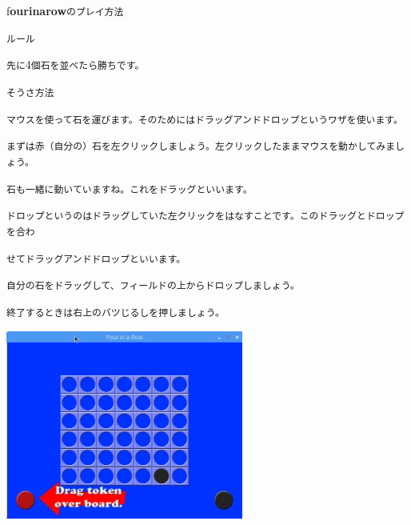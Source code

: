 \documentclass[a4paper,dvipdfmx]{jarticle}
\newcommand\textstyleqwerty[1]{#1}
\begin{document}
\bigskip

\textstyleqwerty{f\textbf{ourinarow}\texttt{のプレイ方法}}

\textstyleqwerty{\texttt{ルール}}

\textstyleqwerty{\texttt{先に}4\texttt{個石を並べたら勝ちです。}}

\textstyleqwerty{\texttt{そうさ方法}}

\textstyleqwerty{\texttt{マウスを使って石を運びます。そのためにはドラッグアンドドロップというワザを使います。}}

\textstyleqwerty{\texttt{まずは赤（自分の）石を左クリックしましょう。左クリックしたままマウスを動かしてみましょう。}}

\textstyleqwerty{\texttt{石も一緒に動いていますね。これをドラッグといいます。}}

\textstyleqwerty{\texttt{ドロップというのはドラッグしていた左クリックをはなすことです。このドラッグとドロップを合わ}}

\textstyleqwerty{\texttt{せてドラッグアンドドロップといいます。}}

\textstyleqwerty{\texttt{自分の石をドラッグして、フィールドの上からドロップしましょう。}}

\textstyleqwerty{\texttt{終了するときは右上のバツじるしを押しましょう。}}


\bigskip



\begin{center}
\includegraphics[width=7.805cm,height=6.218cm]{text02-img/text02-img019.jpg}

\end{center}

\bigskip


\bigskip


\bigskip


\bigskip


\bigskip
\end{document}
